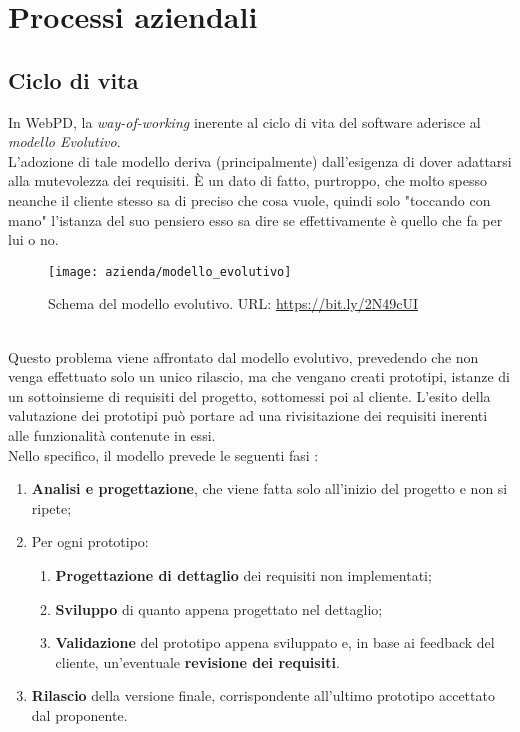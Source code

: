 \section{Processi aziendali}
\subsection{Ciclo di vita}
\label{sec:modello-evolutivo}
In WebPD, la \textit{way-of-working} inerente al ciclo di vita del software aderisce al \textit{modello Evolutivo}.\\
L'adozione di tale modello deriva (principalmente) dall'esigenza di dover adattarsi alla mutevolezza dei requisiti. È un dato di fatto, purtroppo, che molto spesso neanche il cliente stesso sa di preciso che cosa vuole, quindi solo "toccando con mano" l'istanza del suo pensiero esso sa dire se effettivamente è quello che fa per lui o no.\\
\begin{figure}[!h] 
	\centering 
	\texttt{[image: azienda/modello\_evolutivo]} 
	\caption{Schema del modello evolutivo. URL: \url{https://bit.ly/2N49cUI} }
\end{figure}\\
Questo problema viene affrontato dal modello evolutivo, prevedendo che non venga effettuato solo un unico rilascio, ma che vengano creati prototipi, istanze di un sottoinsieme di requisiti del progetto, sottomessi poi al cliente. L'esito della valutazione dei prototipi può portare ad una rivisitazione dei requisiti inerenti alle funzionalità contenute in essi.\\
Nello specifico, il modello prevede le seguenti fasi :
\begin{enumerate}
	\item \textbf{Analisi e progettazione}, che viene fatta solo all'inizio del progetto e non si ripete;
	\item Per ogni prototipo:
		\begin{enumerate}
			\item \textbf{Progettazione di dettaglio} dei requisiti non implementati;
			\item \textbf{Sviluppo} di quanto appena progettato nel dettaglio;
			\item \textbf{Validazione} del prototipo appena sviluppato e, in base ai feedback del cliente, un'eventuale \textbf{revisione dei requisiti}.
		\end{enumerate}
	\item \textbf{Rilascio} della versione finale, corrispondente all'ultimo prototipo accettato dal proponente.
\end{enumerate}
